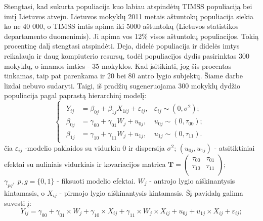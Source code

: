 \documentclass[11pt,a4paper]{article}
\begin{document}
\indent Stengtasi, kad sukurta populiacija kuo labiau atspindėtų TIMSS populiaciją bei imtį Lietuvos atveju. Lietuvos mokyklų 2011 metais aštuntokų populiacija siekia ko ne 40 000, o TIMSS imtis apima iki 5000 aštuntokų (Lietuvos statistikos departamento duomenimis). Ji apima vos 12\% visos aštuntokų populiacijos. Tokią procentinę dalį stengtasi atspindėti. Deja, didelė populiacija ir didelės imtys reikalauja ir daug kompiuterio resursų, todėl populiacijos dydis pasirinktas 300 mokyklų, o imamos imties - 35 mokyklos. Kad įsitikinti, jog šis procentas tinkamas, taip pat parenkama ir 20 bei 80 antro lygio subjektų. Šiame darbe lizdai nebuvo sudaryti. Taigi, iš pradžių sugeneruojama 300 mokyklų dydžio populiacija pagal paprastą hierarchinį modelį:
\begin{equation}\label{eq:simul}
\left\{
\begin{array}{l}
\begin{split}
Y_{ij}&=\beta_{0j}+\beta_{1j}X_{1ij}+\varepsilon_{ij}, &\varepsilon_{ij}\sim (0, \sigma^2);\\
\beta_{0j}&=\gamma_{00}+\gamma_{01}W_j+u_{0j}, & u_{0j}\sim (0, \tau_{00});\\
\beta_{1j}&=\gamma_{10}+\gamma_{11}W_j+u_{1j}, & u_{1j}\sim (0, \tau_{11}).
\end{split}
\end{array} \right.
\end{equation}
čia $\varepsilon_{ij}$ -modelio paklaidos su vidurkiu $0$ ir dispersija $\sigma^2$; $\left(u_{0j}, u_{1j}\right)$ - atsitiktiniai efektai su nuliniais vidurkiais ir kovariacijos matrica $\mathbf{T}=\begin{pmatrix}
\tau_{00} & \tau_{01} \\
\tau_{10} & \tau_{11} \\
\end{pmatrix}$; $\gamma_{pq},\ p,g = \{0,1\}$ - fiksuoti modelio efektai. $W_j$ - antrojo lygio aiškinantysis kintamasis, o $X_{ij}$ - pirmojo lygio aiškinantysis kintamasis. Šį pavidalą galima suvesti į:
\begin{equation} \label{eq:deq}
Y_{ij} = \gamma_{00} +\gamma_{01}\times W_{j}+ \gamma_{10}\times X_{ij}+\gamma_{11}\times W_{j}\times X_{ij}+u_{0j}+u_{1j}\times X_{ij}+\varepsilon_{ij};
\end{equation}
\end{document}
